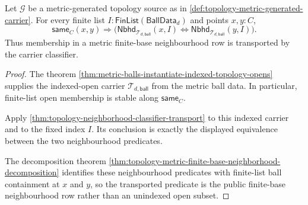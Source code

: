 \begin{theorem}
\label{thm:topology-metric-finite-base-neighborhood-classifier-transport}
Let $\mathcal{G}$ be a metric-generated topology source as in \autoref{def:topology-metric-generated-carrier}. For every finite list $I:\mathsf{FinList}(\mathsf{BallData}_d)$ and points $x,y:C$,
$$
\mathsf{same}_C(x,y)
\Longrightarrow
\bigl(
\mathsf{Nbhd}_{\mathcal{T}_{d,\mathsf{ball}}}(x,I)
\Longleftrightarrow
\mathsf{Nbhd}_{\mathcal{T}_{d,\mathsf{ball}}}(y,I)
\bigr).
$$
Thus membership in a metric finite-base neighbourhood row is transported by the carrier classifier.
\end{theorem}
\begin{proof}
The theorem \autoref{thm:metric-balls-instantiate-indexed-topology-opens} supplies the indexed-open carrier $\mathcal{T}_{d,\mathsf{ball}}$ from the metric ball data. In particular, finite-list open membership is stable along $\mathsf{same}_C$.

Apply \autoref{thm:topology-neighborhood-classifier-transport} to this indexed carrier and to the fixed index $I$. Its conclusion is exactly the displayed equivalence between the two neighbourhood predicates.

The decomposition theorem \autoref{thm:topology-metric-finite-base-neighborhood-decomposition} identifies these neighbourhood predicates with finite-list ball containment at $x$ and $y$, so the transported predicate is the public finite-base neighbourhood row rather than an unindexed open subset.
\end{proof}


